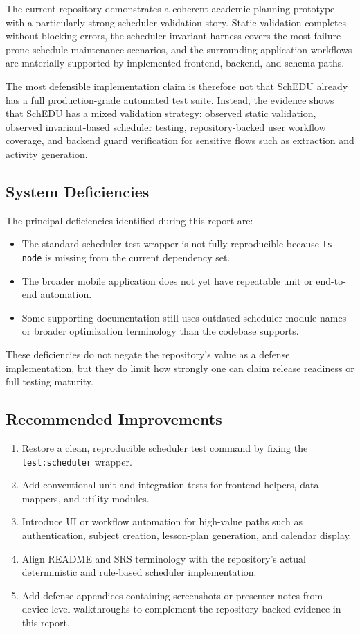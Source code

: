 \documentclass[12pt]{article}
\begin{document}
The current repository demonstrates a coherent academic planning prototype with a particularly strong scheduler-validation story. Static validation completes without blocking errors, the scheduler invariant harness covers the most failure-prone schedule-maintenance scenarios, and the surrounding application workflows are materially supported by implemented frontend, backend, and schema paths.

The most defensible implementation claim is therefore not that SchEDU already has a full production-grade automated test suite. Instead, the evidence shows that SchEDU has a mixed validation strategy: observed static validation, observed invariant-based scheduler testing, repository-backed user workflow coverage, and backend guard verification for sensitive flows such as extraction and activity generation.

\subsection{System Deficiencies}

The principal deficiencies identified during this report are:
\begin{itemize}
    \item The standard scheduler test wrapper is not fully reproducible because \texttt{ts-node} is missing from the current dependency set.
    \item The broader mobile application does not yet have repeatable unit or end-to-end automation.
    \item Some supporting documentation still uses outdated scheduler module names or broader optimization terminology than the codebase supports.
\end{itemize}

These deficiencies do not negate the repository's value as a defense implementation, but they do limit how strongly one can claim release readiness or full testing maturity.

\subsection{Recommended Improvements}

\begin{enumerate}
    \item Restore a clean, reproducible scheduler test command by fixing the \texttt{test:scheduler} wrapper.
    \item Add conventional unit and integration tests for frontend helpers, data mappers, and utility modules.
    \item Introduce UI or workflow automation for high-value paths such as authentication, subject creation, lesson-plan generation, and calendar display.
    \item Align README and SRS terminology with the repository's actual deterministic and rule-based scheduler implementation.
    \item Add defense appendices containing screenshots or presenter notes from device-level walkthroughs to complement the repository-backed evidence in this report.
\end{enumerate}
\end{document}
